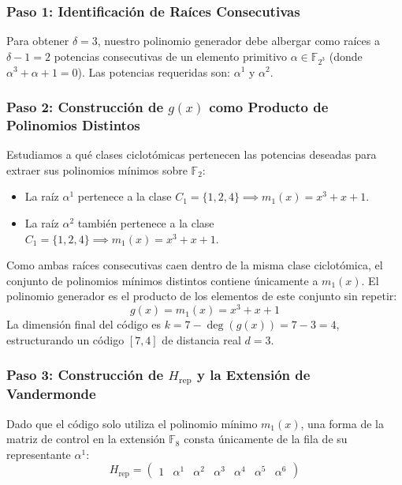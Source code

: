 \documentclass{article}
\begin{document}
\subsubsection{Paso 1: Identificación de Raíces Consecutivas}
Para obtener $\delta = 3$, nuestro polinomio generador debe albergar como raíces a $\delta - 1 = 2$ potencias consecutivas de un elemento primitivo $\alpha \in \mathbb{F}_{2^3}$ (donde $\alpha^3 + \alpha + 1 = 0$). Las potencias requeridas son: $\alpha^1$ y $\alpha^2$.

\subsubsection{Paso 2: Construcción de $g(x)$ como Producto de Polinomios Distintos}
Estudiamos a qué clases ciclotómicas pertenecen las potencias deseadas para extraer sus polinomios mínimos sobre $\mathbb{F}_2$:
\begin{itemize}
    \item La raíz $\alpha^1$ pertenece a la clase $C_1 = \{1, 2, 4\} \implies m_1(x) = x^3 + x + 1$.
    \item La raíz $\alpha^2$ también pertenece a la clase $C_1 = \{1, 2, 4\} \implies m_1(x) = x^3 + x + 1$.
\end{itemize}
Como ambas raíces consecutivas caen dentro de la misma clase ciclotómica, el conjunto de polinomios mínimos distintos contiene únicamente a $m_1(x)$. El polinomio generador es el producto de los elementos de este conjunto sin repetir:
\[
g(x) = m_1(x) = x^3 + x + 1
\]
La dimensión final del código es $k = 7 - \operatorname{deg}(g(x)) = 7 - 3 = 4$, estructurando un código $[7, 4]$ de distancia real $d=3$.

\subsubsection{Paso 3: Construcción de $H_{\text{rep}}$ y la Extensión de Vandermonde}
Dado que el código solo utiliza el polinomio mínimo $m_1(x)$, una forma de la matriz de control en la extensión $\mathbb{F}_8$ consta únicamente de la fila de su representante $\alpha^1$:
\[
H_{\text{rep}} = \begin{pmatrix}
1 & \alpha^1 & \alpha^2 & \alpha^3 & \alpha^4 & \alpha^5 & \alpha^6
\end{pmatrix}
\]
\end{document}
